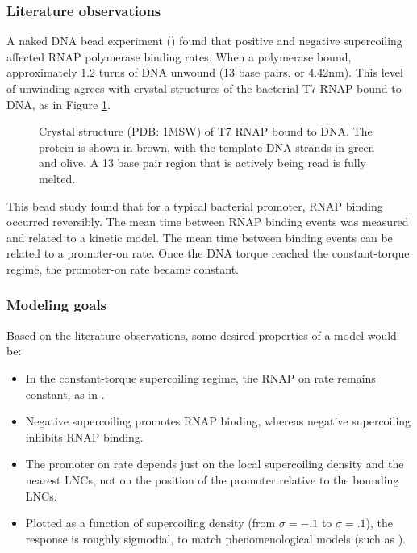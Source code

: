 \documentclass[11pt]{article}
\begin{document}
\subsubsection{Literature observations}
A naked DNA bead experiment (\textcite{revyakinPromoterUnwindingPromoter2004}) found that positive and negative supercoiling affected RNAP polymerase binding rates. When a polymerase bound, approximately 1.2 turns of DNA unwound (13 base pairs, or 4.42nm). This level of unwinding agrees with crystal structures of the bacterial T7 RNAP bound to DNA, as in Figure \ref{fig:rnap_bound}.

\begin{figure}[h]
    \centering
    \caption{Crystal structure (PDB: 1MSW) of T7 RNAP bound to DNA. The protein is shown in brown, with the template DNA strands in green and olive.
             A 13 base pair region that is actively being read is fully melted.}
    \label{fig:rnap_bound}
\end{figure}

This bead study found that for a typical bacterial promoter, RNAP binding occurred reversibly. The mean time between RNAP binding events was measured and related to a kinetic model. The mean time between binding events can be related to a promoter-on rate. Once the DNA torque reached the constant-torque regime, the promoter-on rate became constant.

\subsubsection{Modeling goals}
Based on the literature observations, some desired properties of a model would be:
\begin{itemize}
    \item In the constant-torque supercoiling regime, the RNAP on rate remains constant, as in \textcite{revyakinPromoterUnwindingPromoter2004}.
    \item Negative supercoiling promotes RNAP binding, whereas negative supercoiling inhibits RNAP binding.
    \item The promoter on rate depends just on the local supercoiling density and the nearest LNCs, not on the position of the promoter relative to the bounding LNCs.
    \item Plotted as a function of supercoiling density (from \(\sigma = -.1\) to \(\sigma = .1\)), the response is roughly sigmodial, to match phenomenological models (such as \textcite{elhoudaiguiBacterialGenomeArchitecture2019a}).
\end{itemize}
\end{document}
